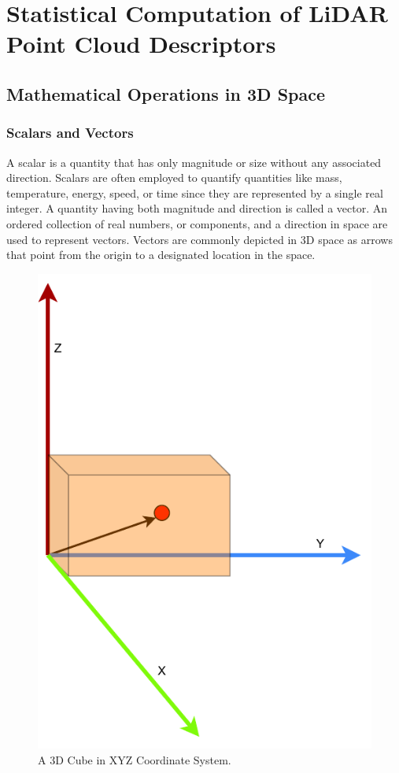 \section{Statistical Computation of LiDAR Point Cloud Descriptors}
\subsection{Mathematical Operations in 3D Space}
\subsubsection{Scalars and Vectors}
A scalar is a quantity that has only magnitude or size without any associated direction. Scalars are often employed to quantify quantities like mass, temperature, energy, speed, or time since they are represented by a single real integer. A quantity having both magnitude and direction is called a vector. An ordered collection of real numbers, or components, and a direction in space are used to represent vectors. Vectors are commonly depicted in 3D space as arrows that point from the origin to a designated location in the space.


\begin{figure}[htbp]
    \centering
    \includegraphics[width=0.4\linewidth]{97_graphics/related_work/scalar_and_vector.pdf}
    \caption{A 3D Cube in XYZ Coordinate System.}
    \label{fig:related_work-scalar_and_vector}
\end{figure}

